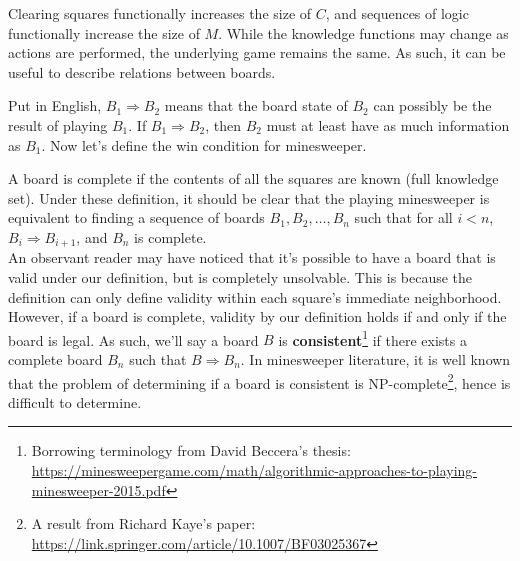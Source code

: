 \defn{Natural Board}{\index{Board!natural}
A minesweeper board is \textbf{natural} if $\forall a\in\mathcal{A}$, $N(a)\in\mathbb{Z}$ if and only if $a\in[0,c)\times[0,r)$ and $C(a)=1$.
}

Clearing squares functionally increases the size of $C$, and sequences of logic functionally increase the size of $M$. While the knowledge functions may change as actions are performed, the underlying game remains the same. As such, it can be useful to describe relations between boards.


Put in English, $B_1\Rightarrow B_2$ means that the board state of $B_2$ can possibly be the result of playing $B_1$. If $B_1\Rightarrow B_2$, then $B_2$ must at least have as much information as $B_1$. Now let's define the win condition for minesweeper.


A board is complete if the contents of all the squares are known (full knowledge set). Under these definition, it should be clear that the playing minesweeper is equivalent to finding a sequence of boards $B_1,B_2,\dots,B_n$ such that for all $i<n$, $B_i\Rightarrow B_{i+1}$, and $B_n$ is complete.\\

An observant reader may have noticed that it's possible to have a board that is valid under our definition, but is completely unsolvable. This is because the definition can only define validity within each square's immediate neighborhood. However, if a board is complete, validity by our definition holds if and only if the board is legal. As such, we'll say a board $B$ is \textbf{consistent}\footnote{Borrowing terminology from David Beccera's thesis: \\\url{https://minesweepergame.com/math/algorithmic-approaches-to-playing-minesweeper-2015.pdf}} if there exists a complete board $B_n$ such that $B\Rightarrow B_n$. In minesweeper literature, it is well known that the problem of determining if a board is consistent is NP-complete\footnote{A result from Richard Kaye's paper: \url{https://link.springer.com/article/10.1007/BF03025367}}, hence is difficult to determine.\\

